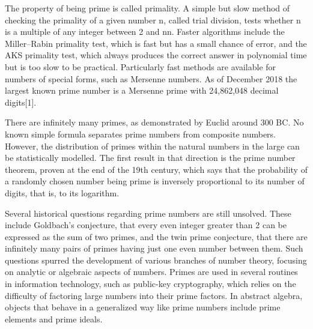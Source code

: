 The property of being prime is called primality. A simple but slow method of
checking the primality of a given number n, called trial division, tests whether
n is a multiple of any integer between 2 and { { {n}}}{ {n}}. Faster algorithms
include the Miller–Rabin primality test, which is fast but has a small chance of
error, and the AKS primality test, which always produces the correct answer in
polynomial time but is too slow to be practical. Particularly fast methods are
available for numbers of special forms, such as Mersenne numbers. As of December
2018 the largest known prime number is a Mersenne prime with 24,862,048 decimal
digits[1].

There are infinitely many primes, as demonstrated by Euclid around 300 BC. No
known simple formula separates prime numbers from composite numbers. However,
the distribution of primes within the natural numbers in the large can be
statistically modelled. The first result in that direction is the prime number
theorem, proven at the end of the 19th century, which says that the probability
of a randomly chosen number being prime is inversely proportional to its number
of digits, that is, to its logarithm.

Several historical questions regarding prime numbers are still unsolved. These
include Goldbach's conjecture, that every even integer greater than 2 can be
expressed as the sum of two primes, and the twin prime conjecture, that there
are infinitely many pairs of primes having just one even number between
them. Such questions spurred the development of various branches of number
theory, focusing on analytic or algebraic aspects of numbers. Primes are used in
several routines in information technology, such as public-key cryptography,
which relies on the difficulty of factoring large numbers into their prime
factors. In abstract algebra, objects that behave in a generalized way like
prime numbers include prime elements and prime ideals.

